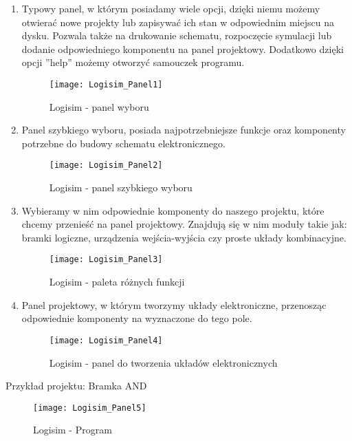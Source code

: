 \documentclass[12pt, a4paper, onside, polish]{article}				%
\begin{document}
 \begin{enumerate}
\item Typowy panel, w którym posiadamy wiele opcji, dzięki niemu możemy otwierać nowe projekty lub zapisywać ich stan w odpowiednim miejscu na dysku. Pozwala także na drukowanie schematu, rozpoczęcie symulacji lub dodanie odpowiedniego komponentu na panel projektowy. Dodatkowo dzięki opcji ''help'' możemy otworzyć samouczek programu.
  	\begin{figure}[H]
  	  {\centering \texttt{[image: Logisim\_Panel1]} \caption{Logisim - panel wyboru}}\vspace{5mm}
  	  \end{figure}
  	  
\item  Panel szybkiego wyboru, posiada najpotrzebniejsze funkcje oraz komponenty potrzebne do budowy schematu elektronicznego.
  	\begin{figure}[H]
  	  {\centering \texttt{[image: Logisim\_Panel2]} \caption{Logisim - panel szybkiego wyboru}}\vspace{5mm}
  	  \end{figure}
  	  
 \cleardoublepage	  
\item Wybieramy w nim odpowiednie komponenty do naszego projektu, które chcemy przenieść na panel projektowy. Znajdują się w nim moduły takie jak: bramki logiczne, urządzenia wejścia-wyjścia czy proste układy kombinacyjne.
  	\begin{figure}[H]
  	  {\centering \texttt{[image: Logisim\_Panel3]} \caption{Logisim - paleta różnych funkcji}}\vspace{5mm}
  	  \end{figure}
  	  
 
 \item Panel projektowy, w którym tworzymy układy elektroniczne, przenosząc odpowiednie komponenty na wyznaczone do tego pole.
  	\begin{figure}[H]
  	  {\centering \texttt{[image: Logisim\_Panel4]} \caption{Logisim -  panel do tworzenia układów elektronicznych}}\vspace{5mm}
  	  \end{figure}
 \end{enumerate}
 
  \cleardoublepage
 Przykład projektu: Bramka AND
  	\begin{figure}[H]
  	  {\centering \texttt{[image: Logisim\_Panel5]} \caption{Logisim - Program}}\vspace{5mm}
  	 \end{figure}
\end{document}
